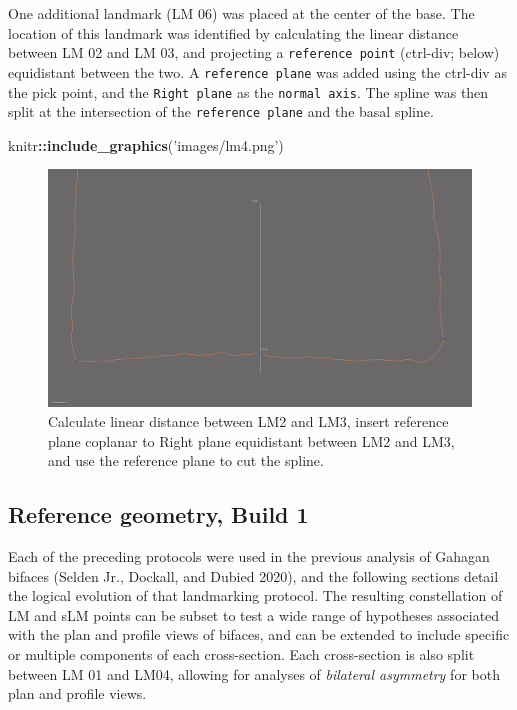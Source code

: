 \documentclass[
]{article}
\newenvironment{Shaded}{\begin{snugshade}}{\end{snugshade}}
\newcommand{\KeywordTok}[1]{\textcolor[rgb]{0.13,0.29,0.53}{\textbf{#1}}}
\newcommand{\NormalTok}[1]{#1}
\newcommand{\OperatorTok}[1]{\textcolor[rgb]{0.81,0.36,0.00}{\textbf{#1}}}
\newcommand{\StringTok}[1]{\textcolor[rgb]{0.31,0.60,0.02}{#1}}
\begin{document}
One additional landmark (LM 06) was placed at the center of the base.
The location of this landmark was identified by calculating the linear
distance between LM 02 and LM 03, and projecting a
\texttt{reference\ point} (ctrl-div; below) equidistant between the two.
A \texttt{reference\ plane} was added using the ctrl-div as the pick
point, and the \texttt{Right\ plane} as the \texttt{normal\ axis}. The
spline was then split at the intersection of the
\texttt{reference\ plane} and the basal spline.

\begin{Shaded}
\begin{Highlighting}[]
\NormalTok{knitr}\OperatorTok{::}\KeywordTok{include_graphics}\NormalTok{(}\StringTok{'images/lm4.png'}\NormalTok{)}
\end{Highlighting}
\end{Shaded}

\begin{figure}
\includegraphics[width=1\linewidth]{images/lm4} \caption{Calculate linear distance between LM2 and LM3, insert reference plane coplanar to Right plane equidistant between LM2 and LM3, and use the reference plane to cut the spline.}\label{fig:figlm4}
\end{figure}

\hypertarget{reference-geometry-build-1}{%
\subsection{Reference geometry, Build
1}\label{reference-geometry-build-1}}

Each of the preceding protocols were used in the previous analysis of
Gahagan bifaces (Selden Jr., Dockall, and Dubied 2020), and the
following sections detail the logical evolution of that landmarking
protocol. The resulting constellation of LM and sLM points can be subset
to test a wide range of hypotheses associated with the plan and profile
views of bifaces, and can be extended to include specific or multiple
components of each cross-section. Each cross-section is also split
between LM 01 and LM04, allowing for analyses of \emph{bilateral
asymmetry} for both plan and profile views.
\end{document}
